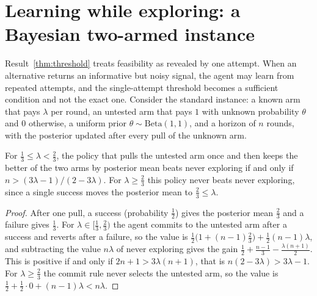 \section[Learning while exploring]{Learning while exploring: a Bayesian two-armed instance}\label{sec:bayes-explore}

Result~\ref{thm:threshold} treats feasibility as revealed by one attempt. When an alternative returns an informative but noisy signal, the agent may learn from repeated attempts, and the single-attempt threshold becomes a sufficient condition and not the exact one. Consider the standard instance: a known arm that pays $\lambda$ per round, an untested arm that pays $1$ with unknown probability $\theta$ and $0$ otherwise, a uniform prior $\theta\sim\mathrm{Beta}(1,1)$, and a horizon of $n$ rounds, with the posterior updated after every pull of the unknown arm.

\begin{newresult}\label{prop:bayes-threshold}
For $\tfrac13\le\lambda<\tfrac23$, the policy that pulls the untested arm once and then keeps the better of the two arms by posterior mean beats never exploring if and only if $n>(3\lambda-1)/(2-3\lambda)$. For $\lambda\ge\tfrac23$ this policy never beats never exploring, since a single success moves the posterior mean to $\tfrac23\le\lambda$.
\end{newresult}
\begin{proof}
After one pull, a success (probability $\tfrac12$) gives the posterior mean $\tfrac23$ and a failure gives $\tfrac13$. For $\lambda\in[\tfrac13,\tfrac23)$ the agent commits to the untested arm after a success and reverts after a failure, so the value is $\tfrac12\bigl(1+(n-1)\tfrac23\bigr)+\tfrac12(n-1)\lambda$, and subtracting the value $n\lambda$ of never exploring gives the gain $\tfrac12+\tfrac{n-1}3-\tfrac{\lambda(n+1)}2$. This is positive if and only if $2n+1>3\lambda(n+1)$, that is $n(2-3\lambda)>3\lambda-1$. For $\lambda\ge\tfrac23$ the commit rule never selects the untested arm, so the value is $\tfrac12+\tfrac12\cdot 0+(n-1)\lambda<n\lambda$.
\end{proof}

